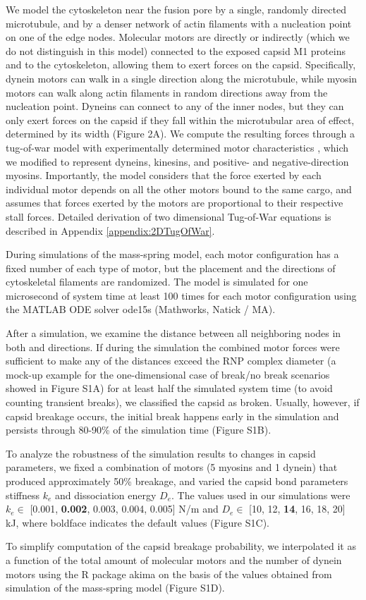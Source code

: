 We model the cytoskeleton near the fusion pore by a single, randomly directed microtubule, and by a denser network of actin filaments with a nucleation point on one of the edge nodes. Molecular motors are directly or indirectly (which we do not distinguish in this model) connected to the exposed capsid M1 proteins and to the cytoskeleton, allowing them to exert forces on the capsid. Specifically, dynein motors can walk in a single direction along the microtubule, while myosin motors can walk along actin filaments in random directions away from the nucleation point. Dyneins can connect to any of the inner nodes, but they can only exert forces on the capsid if they fall within the microtubular area of effect, determined by its width (Figure 2A).
We compute the resulting forces through a tug-of-war model with experimentally determined motor characteristics \cite{gennerich2007force, muller2008tug, norstrom2010unconventional}, which we modified to represent dyneins, kinesins, and positive- and negative-direction myosins. Importantly, the model considers that the force exerted by each individual motor depends on all the other motors bound to the same cargo, and assumes that forces exerted by the motors are proportional to their respective stall forces. Detailed derivation of two dimensional Tug-of-War equations is described in Appendix \ref{appendix:2DTugOfWar}.
 
During simulations of the mass-spring model, each motor configuration has a fixed number of each type of motor, but the placement and the directions of cytoskeletal filaments are randomized. The model is simulated for one microsecond of system time at least 100 times for each motor configuration using the MATLAB ODE solver ode15s (Mathworks, Natick / MA).

After a simulation, we examine the distance between all neighboring nodes in both   and   directions. If during the simulation the combined motor forces were sufficient to make any of the distances exceed the RNP complex diameter (a mock-up example for the one-dimensional case of break/no break scenarios showed in Figure S1A) for at least half the simulated system time (to avoid counting transient breaks), we classified the capsid as broken. Usually, however, if capsid breakage occurs, the initial break happens early in the simulation and persists through 80-90\% of the simulation time (Figure S1B).

To analyze the robustness of the simulation results to changes in capsid parameters, we fixed a combination of motors (5 myosins and 1 dynein) that produced approximately 50\% breakage, and varied the capsid bond parameters stiffness $k_e$ and dissociation energy $D_e$. The values used in our simulations were $k_e \in$ [0.001, \textbf{0.002}, 0.003, 0.004, 0.005] N/m and $D_e \in$ [10, 12, \textbf{14}, 16, 18, 20] kJ, where boldface indicates the default values (Figure S1C).

To simplify computation of the capsid breakage probability, we interpolated it as a function of the total amount of molecular motors and the number of dynein motors using the R package akima on the basis of the values obtained from simulation of the mass-spring model (Figure S1D).
